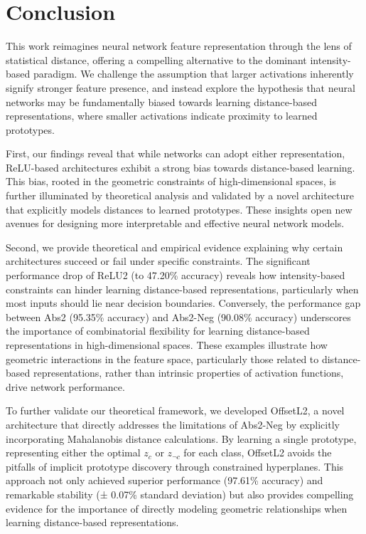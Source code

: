 \section{Conclusion}

This work reimagines neural network feature representation through the lens of statistical distance, offering a compelling alternative to the dominant intensity-based paradigm. We challenge the assumption that larger activations inherently signify stronger feature presence, and instead explore the hypothesis that neural networks may be fundamentally biased towards learning distance-based representations, where smaller activations indicate proximity to learned prototypes.

First, our findings reveal that while networks can adopt either representation, ReLU-based architectures exhibit a strong bias towards distance-based learning. This bias, rooted in the geometric constraints of high-dimensional spaces, is further illuminated by theoretical analysis and validated by a novel architecture that explicitly models distances to learned prototypes. These insights open new avenues for designing more interpretable and effective neural network models.

Second, we provide theoretical and empirical evidence explaining why certain architectures succeed or fail under specific constraints. The significant performance drop of ReLU2 (to 47.20\% accuracy) reveals how intensity-based constraints can hinder learning distance-based representations, particularly when most inputs should lie near decision boundaries. Conversely, the performance gap between Abs2 (95.35\% accuracy) and Abs2-Neg (90.08\% accuracy) underscores the importance of combinatorial flexibility for learning distance-based representations in high-dimensional spaces. These examples illustrate how geometric interactions in the feature space, particularly those related to distance-based representations, rather than intrinsic properties of activation functions, drive network performance.

To further validate our theoretical framework, we developed OffsetL2, a novel architecture that directly addresses the limitations of Abs2-Neg by explicitly incorporating Mahalanobis distance calculations. By learning a single prototype, representing either the optimal $z_c$ or $z_{\neg c}$ for each class, OffsetL2 avoids the pitfalls of implicit prototype discovery through constrained hyperplanes. This approach not only achieved superior performance (97.61\% accuracy) and remarkable stability (± 0.07\% standard deviation) but also provides compelling evidence for the importance of directly modeling geometric relationships when learning distance-based representations.


